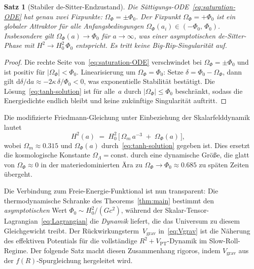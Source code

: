 \documentclass[12pt,a4paper]{article}
\theoremstyle{definition}
\theoremstyle{plain}
\newtheorem{proposition}[definition]{Satz}
\theoremstyle{remark}
\newcommand{\dd}{\mathrm{d}}
\begin{document}
\begin{proposition}[Stabiler de-Sitter-Endzustand]\label{prop:saturation}
Die S\"attigungs-ODE~\eqref{eq:saturation-ODE} hat genau zwei
Fixpunkte: $\Omega_{\Phi} = \pm\Phi_{0}$. Der Fixpunkt
$\Omega_{\Phi} = +\Phi_{0}$ ist ein globaler Attraktor f\"ur alle
Anfangsbedingungen $\Omega_{\Phi}(a_{i}) \in (-\Phi_{0},\,\Phi_{0})$.
Insbesondere gilt $\Omega_{\Phi}(a) \to \Phi_{0}$ f\"ur $a \to \infty$,
was einer asymptotischen de-Sitter-Phase mit
$H^{2} \to H_{0}^{2}\,\Phi_{0}$ entspricht. Es tritt keine
Big-Rip-Singularit\"at auf.
\end{proposition}

\begin{proof}
Die rechte Seite von~\eqref{eq:saturation-ODE} verschwindet bei
$\Omega_{\Phi} = \pm\Phi_{0}$ und ist positiv f\"ur
$|\Omega_{\Phi}| < \Phi_{0}$. Linearisierung um
$\Omega_{\Phi} = \Phi_{0}$: Setze $\delta = \Phi_{0} - \Omega_{\Phi}$,
dann gilt $\dd\delta/\dd a \approx -2\kappa\,\delta/\Phi_{0} < 0$,
was exponentielle Stabilit\"at best\"atigt. Die
L\"osung~\eqref{eq:tanh-solution} ist f\"ur alle~$a$ durch
$|\Omega_{\Phi}| \leq \Phi_{0}$ beschr\"ankt, sodass die Energiedichte
endlich bleibt und keine zuk\"unftige Singularit\"at auftritt.
\end{proof}

Die modifizierte Friedmann-Gleichung unter Einbeziehung der
Skalarfelddynamik lautet
\begin{equation}\label{eq:modified-Friedmann}
  H^{2}(a) \;=\; H_{0}^{2}\,
  \bigl[\,\Omega_{m}\,a^{-3} \;+\; \Omega_{\Phi}(a)\,\bigr],
\end{equation}
wobei $\Omega_{m} \approx 0.315$ und $\Omega_{\Phi}(a)$ durch~\eqref{eq:tanh-solution} gegeben ist. Dies ersetzt die kosmologische
Konstante $\Omega_{\Lambda} = \mathrm{const.}$ durch eine dynamische
Gr\"o\ss e, die glatt von $\Omega_{\Phi} \approx 0$ in der
materiedominierten \"Ara zu $\Omega_{\Phi} \to \Phi_{0} \approx 0.685$
zu sp\"aten Zeiten \"ubergeht.

\medskip
Die Verbindung zum Freie-Energie-Funktional ist nun transparent: Die
thermodynamische Schranke des Theorems~\ref{thm:main} bestimmt den
\emph{asymptotischen} Wert $\Phi_{0} \sim H_{0}^{2}/(Gc^{2})$, w\"ahrend
der Skalar-Tensor-Lagrangian~\eqref{eq:Lagrangian} die \emph{Dynamik}
liefert, die das Universum zu diesem Gleichgewicht treibt. Der
R\"uckwirkungsterm~$V_{\mathrm{grav}}$ in~\eqref{eq:Vgrav} ist die
N\"aherung des effektiven Potentials f\"ur die vollst\"andige
$R^{2} + V_{\mathrm{PT}}$-Dynamik im Slow-Roll-Regime. Der folgende
Satz macht diesen Zusammenhang rigoros, indem $V_{\mathrm{grav}}$ aus
der $f(R)$-Spurgleichung hergeleitet wird.
\end{document}
